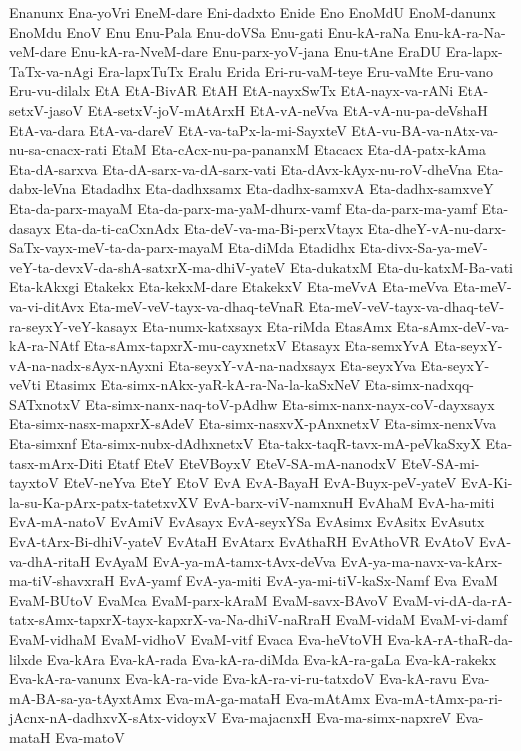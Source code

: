 {Enanunx
Ena-yoVri
EneM-dare
Eni-dadxto
Enide
Eno
EnoMdU
EnoM-danunx
EnoMdu
EnoV
Enu
Enu-Pala
Enu-doVSa
Enu-gati
Enu-kA-raNa
Enu-kA-ra-Na-veM-dare
Enu-kA-ra-NveM-dare
Enu-parx-yoV-jana
Enu-tAne
EraDU
Era-lapx-TaTx-va-nAgi
Era-lapxTuTx
Eralu
Erida
Eri-ru-vaM-teye
Eru-vaMte
Eru-vano
Eru-vu-dilalx
EtA
EtA-BivAR
EtAH
EtA-nayxSwTx
EtA-nayx-va-rANi
EtA-setxV-jasoV
EtA-setxV-joV-mAtArxH
EtA-vA-neVva
EtA-vA-nu-pa-deVshaH
EtA-va-dara
EtA-va-dareV
EtA-va-taPx-la-mi-SayxteV
EtA-vu-BA-va-nAtx-va-nu-sa-cnacx-rati
EtaM
Eta-cAcx-nu-pa-pananxM
Etacacx
Eta-dA-patx-kAma
Eta-dA-sarxva
Eta-dA-sarx-va-dA-sarx-vati
Eta-dAvx-kAyx-nu-roV-dheVna
Eta-dabx-leVna
Etadadhx
Eta-dadhxsamx
Eta-dadhx-samxvA
Eta-dadhx-samxveY
Eta-da-parx-mayaM
Eta-da-parx-ma-yaM-dhurx-vamf
Eta-da-parx-ma-yamf
Eta-dasayx
Eta-da-ti-caCxnAdx
Eta-deV-va-ma-Bi-perxVtayx
Eta-dheY-vA-nu-darx-SaTx-vayx-meV-ta-da-parx-mayaM
Eta-diMda
Etadidhx
Eta-divx-Sa-ya-meV-veY-ta-devxV-da-shA-satxrX-ma-dhiV-yateV
Eta-dukatxM
Eta-du-katxM-Ba-vati
Eta-kAkxgi
Etakekx
Eta-kekxM-dare
EtakekxV
Eta-meVvA
Eta-meVva
Eta-meV-va-vi-ditAvx
Eta-meV-veV-tayx-va-dhaq-teVnaR
Eta-meV-veV-tayx-va-dhaq-teV-ra-seyxY-veY-kasayx
Eta-numx-katxsayx
Eta-riMda
EtasAmx
Eta-sAmx-deV-va-kA-ra-NAtf
Eta-sAmx-tapxrX-mu-cayxnetxV
Etasayx
Eta-semxYvA
Eta-seyxY-vA-na-nadx-sAyx-nAyxni
Eta-seyxY-vA-na-nadxsayx
Eta-seyxYva
Eta-seyxY-veVti
Etasimx
Eta-simx-nAkx-yaR-kA-ra-Na-la-kaSxNeV
Eta-simx-nadxqq-SATxnotxV
Eta-simx-nanx-naq-toV-pAdhw
Eta-simx-nanx-nayx-coV-dayxsayx
Eta-simx-nasx-mapxrX-sAdeV
Eta-simx-nasxvX-pAnxnetxV
Eta-simx-nenxVva
Eta-simxnf
Eta-simx-nubx-dAdhxnetxV
Eta-takx-taqR-tavx-mA-peVkaSxyX
Eta-tasx-mArx-Diti
Etatf
EteV
EteVBoyxV
EteV-SA-mA-nanodxV
EteV-SA-mi-tayxtoV
EteV-neYva
EteY
EtoV
EvA
EvA-BayaH
EvA-Buyx-peV-yateV
EvA-Ki-la-su-Ka-pArx-patx-tatetxvXV
EvA-barx-viV-namxnuH
EvAhaM
EvA-ha-miti
EvA-mA-natoV
EvAmiV
EvAsayx
EvA-seyxYSa
EvAsimx
EvAsitx
EvAsutx
EvA-tArx-Bi-dhiV-yateV
EvAtaH
EvAtarx
EvAthaRH
EvAthoVR
EvAtoV
EvA-va-dhA-ritaH
EvAyaM
EvA-ya-mA-tamx-tAvx-deVva
EvA-ya-ma-navx-va-kArx-ma-tiV-shavxraH
EvA-yamf
EvA-ya-miti
EvA-ya-mi-tiV-kaSx-Namf
Eva
EvaM
EvaM-BUtoV
EvaMca
EvaM-parx-kAraM
EvaM-savx-BAvoV
EvaM-vi-dA-da-rA-tatx-sAmx-tapxrX-tayx-kapxrX-va-Na-dhiV-naRraH
EvaM-vidaM
EvaM-vi-damf
EvaM-vidhaM
EvaM-vidhoV
EvaM-vitf
Evaca
Eva-heVtoVH
Eva-kA-rA-thaR-da-lilxde
Eva-kAra
Eva-kA-rada
Eva-kA-ra-diMda
Eva-kA-ra-gaLa
Eva-kA-rakekx
Eva-kA-ra-vanunx
Eva-kA-ra-vide
Eva-kA-ra-vi-ru-tatxdoV
Eva-kA-ravu
Eva-mA-BA-sa-ya-tAyxtAmx
Eva-mA-ga-mataH
Eva-mAtAmx
Eva-mA-tAmx-pa-ri-jAcnx-nA-dadhxvX-sAtx-vidoyxV
Eva-majacnxH
Eva-ma-simx-napxreV
Eva-mataH
Eva-matoV
}
